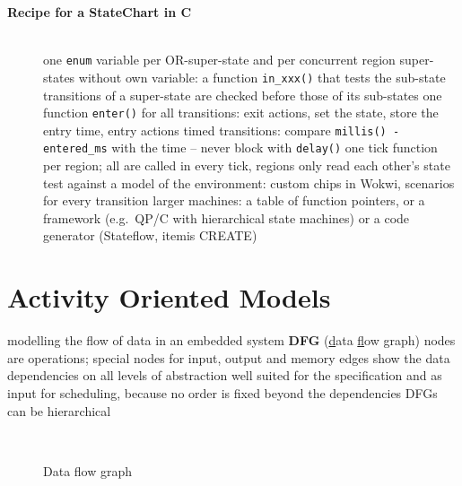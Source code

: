 \begin{description}
\item[{\rot\bf Recipe for a StateChart in C}]~\\[-\lblskip]
\bi
	\ite one \texttt{enum} variable per OR-super-state and per concurrent region
	\ite super-states without own variable: a function \texttt{in\_xxx()} that tests the sub-state
	\ite transitions of a super-state are checked before those of its sub-states
	\ite one function \texttt{enter()} for all transitions: exit actions, set the state, store the entry time, entry actions
	\ite timed transitions: compare \texttt{millis() - entered\_ms} with the time -- never block with \texttt{delay()}
	\ite one tick function per region; all are called in every tick, regions only read each other's state
	\ite test against a model of the environment: custom chips in Wokwi, scenarios for every transition
	\ite larger machines: a table of function pointers, or a framework (e.g.\ QP/C with hierarchical state machines) or a code generator (Stateflow, itemis CREATE)
\ei
\os{\newpage}
\end{description}

\section{Activity Oriented Models}

\bi
	\ite modelling the flow of data in an embedded system \pr \textbf{DFG} (\underline{d}ata \underline{f}low \underline{g}raph)
	\ite nodes are operations; special nodes for input, output and memory
	\ite edges show the data dependencies on all levels of abstraction
	\ite well suited for the specification and as input for scheduling, because no order is fixed beyond the dependencies
	\ite DFGs can be hierarchical
\ei

\begin{figure}[!hbtp]
     \begin{center}
	  \\
	  \caption{Data flow graph}
     \end{center}
\end{figure}

